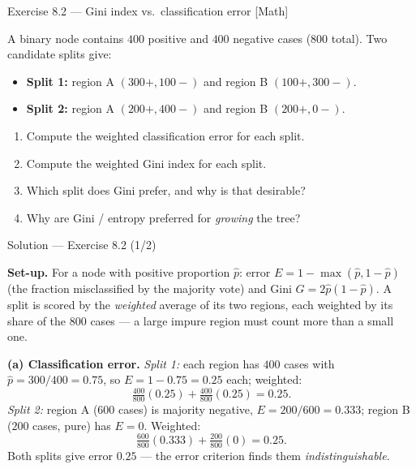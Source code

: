 \documentclass[aspectratio=169,11pt]{beamer}
\begin{document}
\begin{frame}{Exercise 8.2 --- Gini index vs.\ classification error [Math]}
\begin{exercise}
A binary node contains $400$ positive and $400$ negative cases ($800$ total). Two candidate splits give:
\begin{itemize}
  \item \textbf{Split 1:} region A $(300+,100-)$ and region B $(100+,300-)$.
  \item \textbf{Split 2:} region A $(200+,400-)$ and region B $(200+,0-)$.
\end{itemize}
\begin{enumerate}
  \item Compute the weighted classification error for each split.
  \item Compute the weighted Gini index for each split.
  \item Which split does Gini prefer, and why is that desirable?
  \item Why are Gini / entropy preferred for \emph{growing} the tree?
\end{enumerate}
\end{exercise}
\end{frame}

\begin{frame}{Solution --- Exercise 8.2 (1/2)}
\begin{solutionbox}
\textbf{Set-up.} For a node with positive proportion $\hat p$: error $E=1-\max(\hat p,1-\hat p)$ (the fraction misclassified by the majority vote) and Gini $G=2\hat p(1-\hat p)$. A split is scored by the \emph{weighted} average of its two regions, each weighted by its share of the $800$ cases --- a large impure region must count more than a small one.

\medskip
\textbf{(a) Classification error.}
\emph{Split 1:} each region has $400$ cases with $\hat p=300/400=0.75$, so $E=1-0.75=0.25$ each; weighted:
\[ \tfrac{400}{800}(0.25)+\tfrac{400}{800}(0.25)=0.25. \]
\emph{Split 2:} region A ($600$ cases) is majority negative, $E=200/600=0.333$; region B ($200$ cases, pure) has $E=0$. Weighted:
\[ \tfrac{600}{800}(0.333)+\tfrac{200}{800}(0)=0.25. \]
Both splits give error $0.25$ --- the error criterion finds them \emph{indistinguishable}.
\end{solutionbox}
\end{frame}
\end{document}
